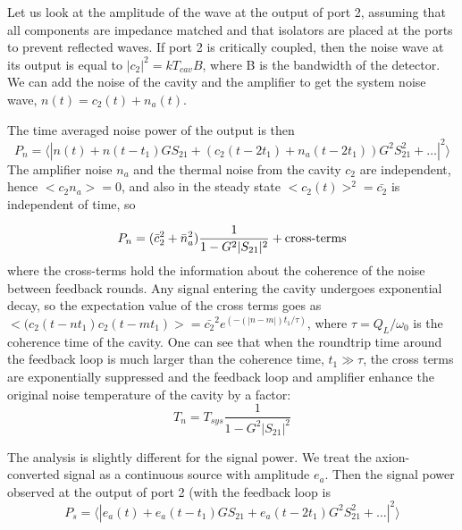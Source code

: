\documentclass[aps,prl,twocolumn,groupedaddress]{revtex4-1}
\begin{document}

Let us look at the amplitude of the wave at the output of port 2, assuming that all components are impedance matched and that isolators are placed at the ports to prevent reflected waves. If port 2 is critically coupled, then the noise wave at its output is equal to $|c_2|^2 =kT_{cav}B$, where B is the bandwidth of the detector. We can add the noise of the cavity and the amplifier to get the system noise wave, $n(t) = c_2(t)+n_a(t)$.

The time averaged noise power of the output is then
\begin{equation}
P_n = \langle |n(t) + n(t-t_1)GS_{21} + (c_2(t-2t_1)+n_a(t-2t_1))G^2S_{21}^2 + \ldots|^2 \rangle
\end{equation}
The amplifier noise $n_a$ and the thermal noise from the cavity $c_2$ are independent, hence $<c_2n_a> = 0$, and also in the steady state $<c_2(t)>^2 = \bar{c_2}$ is independent of time, so

\begin{equation}
P_n = (\bar{c}_2^2 + \bar{n}_a^2)\frac{1}{1 - G^2|S_{21}|^2} + \text{cross-terms} \\
\end{equation}
where the cross-terms hold the information about the coherence of the noise between feedback rounds. Any signal entering the cavity undergoes exponential decay, so the expectation value of the cross terms goes as $<(c_2(t-nt_1)c_2(t-mt_1)> = \bar{c_2}^2e^(-(|n-m|)t_1/\tau)$, where $\tau = Q_L/\omega_0$ is the coherence time of the cavity. One can see that when the roundtrip time around the feedback loop is much larger than the coherence time, $t_1 \gg \tau$, the cross terms are exponentially suppressed and the feedback loop and amplifier enhance the original noise temperature of the cavity by a factor:
\begin{equation}
T_n = T_{sys}\frac{1}{1-G^2|S_{21}|^2}
\end{equation}

The analysis is slightly different for the signal power. We treat the axion-converted signal as a continuous source with amplitude $e_a$. Then the signal power observed at the output of port 2 (with the feedback loop is
\begin{equation}
P_s = \langle |e_a(t) + e_a(t-t_1)GS_{21} + e_a(t-2t_1)G^2S_{21}^2 + \ldots|^2 \rangle
\end{equation}
\end{document}
